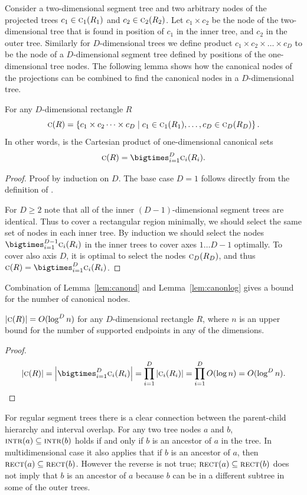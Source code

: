 \documentclass[english,gradu]{tktltiki2018}
\begin{document}
Consider a two-dimensional segment tree and two arbitrary nodes of the projected trees $c_1\in\canoni{R_1}{1}$ and $c_2\in\canoni{R_2}{2}$.
Let $c_1\times c_2$ be the node of the two-dimensional tree that is found in position of $c_1$ in the inner tree, and $c_2$ in the outer tree.
Similarly for $D$-dimensional trees we define product $c_1\times c_2\times\dots\times c_D$ to be the node of a $D$-dimensional segment tree defined by positions of the one-dimensional tree nodes.
The following lemma shows how the canonical nodes of the projections can be combined to find the canonical nodes in a $D$-dimensional tree.

\begin{lem}\label{lem:canond}
For any $D$-dimensional rectangle $R$
$$\canon{R}=\set{c_1\times c_2\dots\times c_D \mid c_1\in\canoni{R_1}{1}, \dots, c_D\in\canoni{R_D}{D}}.$$
In other words,  is the Cartesian product of one-dimensional canonical sets
$$\canon{R}=\bigtimes_{i=1}^D \canoni{R_i}{i}.$$
\end{lem}
\begin{proof}
Proof by induction on $D$.
The base case $D=1$ follows directly from the definition of .

For $D\ge 2$ note that all of the inner $(D-1)$-dimensional segment trees are identical.
Thus to cover a rectangular region minimally, we should select the same set of nodes in each inner tree.
By induction we should select the nodes $\bigtimes_{i=1}^{D-1} \canoni{R_i}{i}$ in the inner trees to cover axes $1\dots D-1$ optimally.
To cover also axis $D$, it is optimal to select the nodes $\canoni{R_D}{D}$, and thus $\canon{R}=\bigtimes_{i=1}^D\canoni{R_i}{i}$.
\end{proof}

Combination of Lemma~\ref{lem:canond} and Lemma~\ref{lem:canonlog} gives a bound for the number of canonical nodes.

\begin{cor}\label{cor:canondcount}$\size{\canon{R}}=O(\log^D\segsize)$ for any $D$-dimensional rectangle $R$, where $n$ is an upper bound for the number of supported endpoints in any of the dimensions.\end{cor}
\begin{proof}
$$
\size{\canon{R}} = \size{\bigtimes_{i=1}^D \canoni{R_i}{i}}
= \prod_{i=1}^D \size{\canoni{R_i}{i}}
= \prod_{i=1}^D O(\log\segsize)
= O(\log^D\segsize).
$$
\end{proof}

For regular segment trees there is a clear connection between the parent-child hierarchy and interval overlap.
For any two tree nodes $a$ and $b$, $\inter{a}\subseteq\inter{b}$ holds if and only if $b$ is an ancestor of $a$ in the tree.
In multidimensional case it also applies that if $b$ is an ancestor of $a$, then $\rect{a}\subseteq\rect{b}$.
However the reverse is not true; $\rect{a}\subseteq\rect{b}$ does not imply that $b$ is an ancestor of $a$ because $b$ can be in a different subtree in some of the outer trees.
\end{document}
